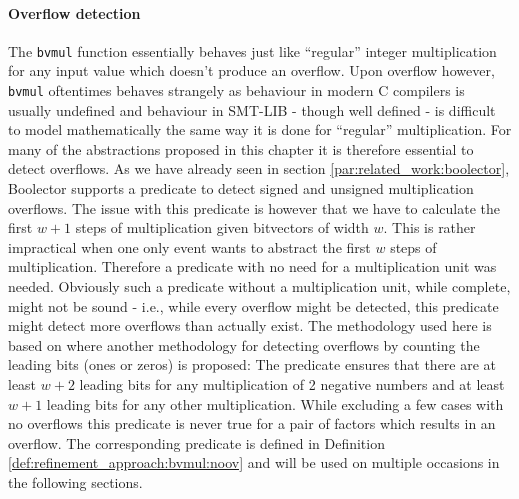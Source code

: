 \paragraph{Overflow detection}
The \texttt{bvmul} function essentially behaves just like \enquote{regular} integer multiplication for any input value
which doesn't produce an overflow.
Upon overflow however, \texttt{bvmul} oftentimes behaves strangely as behaviour in modern C compilers is usually undefined
and behaviour in SMT-LIB - though well defined - is difficult to model mathematically the same way it is done for \enquote{regular} multiplication.
For many of the abstractions proposed in this chapter it is therefore essential to detect overflows.
As we have already seen in section \ref{par:related_work:boolector}, Boolector supports a predicate to detect signed and unsigned multiplication overflows.
The issue with this predicate is however that we have to calculate the first $w+1$ steps of multiplication given bitvectors of width $w$.
This is rather impractical when one only event wants to abstract the first $w$ steps of multiplication.
Therefore a predicate with no need for a multiplication unit was needed.
Obviously such a predicate without a multiplication unit, while complete, might not be sound - i.e., while every overflow might be detected,
this predicate might detect more overflows than actually exist.
The methodology used here is based on \cite{Warren-HackersDelight} where another methodology for detecting overflows by counting the leading bits (ones or zeros)
is proposed:
The predicate ensures that there are at least $w+2$ leading bits for any multiplication of 2 negative numbers and at least $w+1$ leading bits for any other multiplication.
While excluding a few cases with no overflows this predicate is never true for a pair of factors which results in an overflow.
The corresponding predicate is defined in Definition \ref{def:refinement_approach:bvmul:noov} and will be used on multiple occasions in the following sections.

